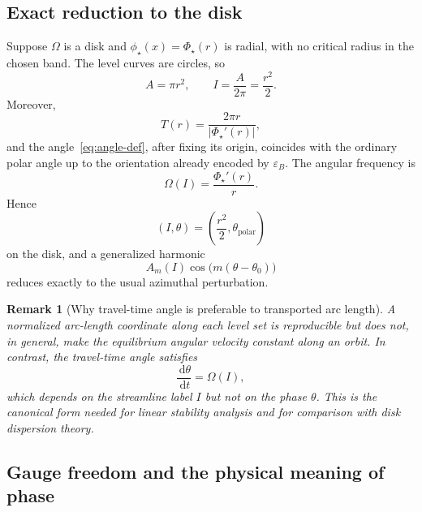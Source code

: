 \documentclass[11pt,a4paper]{article}
\newcommand{\Om}{\Omega}
\newcommand{\dd}{\,\mathrm{d}}
\newcommand{\abs}[1]{\left|#1\right|}
\newtheorem{remark}{Remark}[section]
\begin{document}
\subsection{Exact reduction to the disk}

Suppose $\Om$ is a disk and $\phi_\star(x)=\Phi_\star(r)$ is radial, with no critical radius in the chosen band. The level curves are circles, so
\begin{equation}
  A=\pi r^2,
  \qquad
  I=\frac{A}{2\pi}=\frac{r^2}{2}.
  \label{eq:disk-action}
\end{equation}
Moreover,
\begin{equation}
  T(r)=\frac{2\pi r}{\abs{\Phi_\star'(r)}},
\end{equation}
and the angle~\eqref{eq:angle-def}, after fixing its origin, coincides with the ordinary polar angle up to the orientation already encoded by $\varepsilon_B$. The angular frequency is
\begin{equation}
  \Omega(I)=\frac{\Phi_\star'(r)}{r}.
  \label{eq:disk-angular-frequency}
\end{equation}
Hence
\begin{equation}
  (I,\theta)=\left(\frac{r^2}{2},\theta_{\mathrm{polar}}\right)
\end{equation}
on the disk, and a generalized harmonic
\begin{equation}
  A_m(I)\cos\bigl(m(\theta-\theta_0)\bigr)
\end{equation}
reduces exactly to the usual azimuthal perturbation.

\begin{remark}[Why travel-time angle is preferable to transported arc length]
A normalized arc-length coordinate along each level set is reproducible but does not, in general, make the equilibrium angular velocity constant along an orbit. In contrast, the travel-time angle satisfies
\begin{equation}
  \frac{\dd\theta}{\dd t}=\Omega(I),
\end{equation}
which depends on the streamline label $I$ but not on the phase $\theta$. This is the canonical form needed for linear stability analysis and for comparison with disk dispersion theory.
\end{remark}

\subsection{Gauge freedom and the physical meaning of phase}
\end{document}
